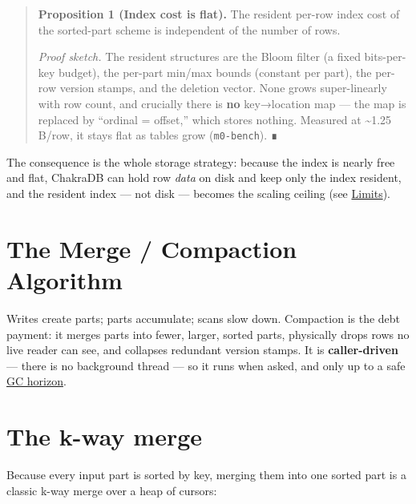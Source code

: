 \documentclass[
  11pt,
  openany]{book}
\begin{document}
\begin{quote}
\textbf{Proposition 1 (Index cost is flat).} The resident per-row index
cost of the sorted-part scheme is independent of the number of rows.

\emph{Proof sketch.} The resident structures are the Bloom filter (a
fixed bits-per-key budget), the per-part min/max bounds (constant per
part), the per-row version stamps, and the deletion vector. None grows
super-linearly with row count, and crucially there is \textbf{no}
key→location map --- the map is replaced by ``ordinal = offset,'' which
stores nothing. Measured at \textasciitilde1.25 B/row, it stays flat as
tables grow (\texttt{m0-bench}). ∎
\end{quote}

The consequence is the whole storage strategy: because the index is
nearly free and flat, ChakraDB can hold row \emph{data} on disk and keep
only the index resident, and the resident index --- not disk --- becomes
the scaling ceiling (see \href{overview.md}{Limits}).

\section{The Merge / Compaction
Algorithm}\label{the-merge-compaction-algorithm}

Writes create parts; parts accumulate; scans slow down. Compaction is
the debt payment: it merges parts into fewer, larger, sorted parts,
physically drops rows no live reader can see, and collapses redundant
version stamps. It is \textbf{caller-driven} --- there is no background
thread --- so it runs when asked, and only up to a safe
\href{mvcc.md}{GC horizon}.

\section{The k-way merge}\label{the-k-way-merge}

Because every input part is sorted by key, merging them into one sorted
part is a classic k-way merge over a heap of cursors:
\end{document}
